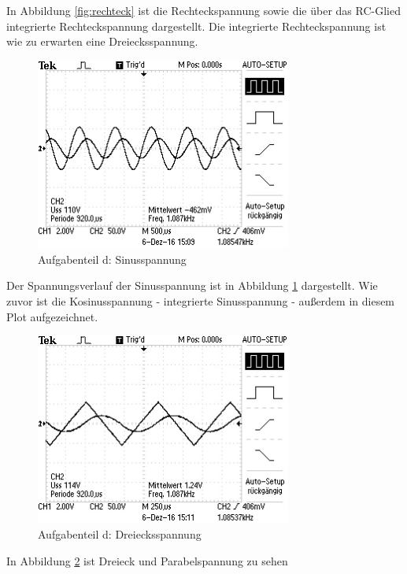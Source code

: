 In Abbildung \ref{fig:rechteck} ist die Rechteckspannung sowie die über das RC-Glied integrierte Rechteckspannung dargestellt.
Die integrierte Rechteckspannung ist wie zu erwarten eine Dreiecksspannung.


\begin{figure}
	\centering
	\includegraphics[width=0.75\textwidth]{bilder/ALL0002/F0002TEK.JPG}
	\caption{Aufgabenteil d: Sinusspannung}
	\label{fig:sinus}
\end{figure}

Der Spannungsverlauf der Sinusspannung ist in Abbildung \ref{fig:sinus} dargestellt. Wie zuvor ist die Kosinusspannung - integrierte Sinusspannung - außerdem in diesem Plot aufgezeichnet.


\begin{figure}
	\centering
	\includegraphics[width=0.75\textwidth]{bilder/ALL0003/F0003TEK.JPG}
	\caption{Aufgabenteil d: Dreiecksspannung}
	\label{fig:dreieck}
\end{figure}

In Abbildung \ref{fig:dreieck} ist Dreieck und Parabelspannung zu sehen
